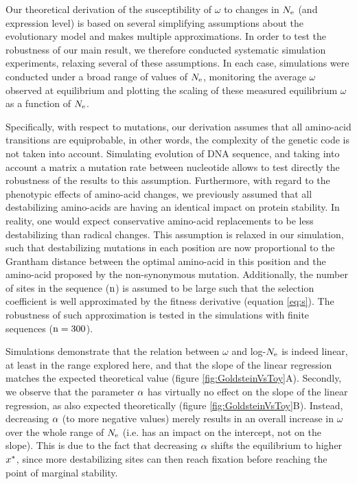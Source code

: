 Our theoretical derivation of the susceptibility of $\omega$ to changes in $N_{\mathrm{e}}$ (and expression level) is based on several simplifying assumptions about the evolutionary model and makes multiple approximations.
In order to test the robustness of our main result, we therefore conducted systematic simulation experiments, relaxing several of these assumptions.
In each case, simulations were conducted under a broad range of values of $N_{\mathrm{e}}$, monitoring the average $\omega$ observed at equilibrium and plotting the scaling of these measured equilibrium $\omega$ as a function of $N_{\mathrm{e}}$. 

Specifically, with respect to mutations, our derivation assumes that all amino-acid {transitions} are equiprobable, in other words, the complexity of the genetic code is not taken into account.
Simulating evolution of \acrshort{DNA} sequence, and taking into account a matrix a mutation rate between nucleotide allows to test directly the robustness of the results to this assumption.
Furthermore, with regard to the phenotypic effects of amino-acid changes, we previously assumed that all destabilizing amino-acids are having an identical impact on protein stability.
In reality, one would expect conservative amino-acid replacements to be less destabilizing than radical changes.
This assumption is relaxed in our simulation, such that destabilizing mutations in each position are now proportional to the Grantham distance \citep{Grantham1974} between the optimal amino-acid in this position and the amino-acid proposed by the non-synonymous mutation.
Additionally, the number of sites in the sequence ($\text{n}$) is assumed to be large such that the selection coefficient is well approximated by the fitness derivative (equation \ref{eq:s}).
The robustness of such approximation is tested in the simulations with finite sequences ($\text{n}=300$).

Simulations demonstrate that the relation between $\omega$ and log-$N_{\mathrm{e}}$ is indeed linear, at least in the range explored here, and that the slope of the linear regression matches the expected theoretical value (figure \ref{fig:GoldsteinVsToy}A).
Secondly, we observe that the parameter $\alpha$ has virtually no effect on the slope of the linear regression, as also expected theoretically (figure \ref{fig:GoldsteinVsToy}B). Instead, decreasing $\alpha$ (to more negative values) merely results in an overall increase in $\omega$ over the whole range of $N_{\mathrm{e}}$ (i.e. has an impact on the intercept, not on the slope). This is due to the fact that decreasing $\alpha$ shifts the equilibrium to higher $x^{*}$, since more destabilizing sites can then reach fixation before reaching the point of marginal stability.

